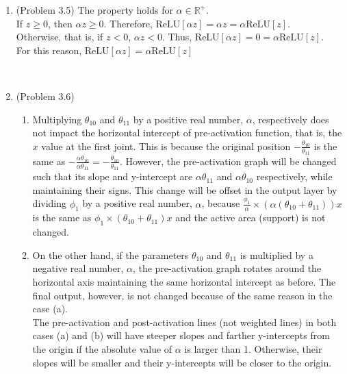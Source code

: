 \documentclass[10pt]{article}
\begin{document}
\begin{enumerate}
\

\item (Problem 3.5) The property holds for $\alpha \in \mathbb{R}^+$. \\
	If $z\geq0$, then $\alpha z\geq0$. Therefore, $\text{ReLU}[\alpha z]=\alpha z=\alpha \text{ReLU}[z]$. \\
	Otherwise, that is, if $z<0$, $\alpha z<0$. Thus, $\text{ReLU}[\alpha z]=0=\alpha \text{ReLU}[z]$. \\
	For this reason, $\text{ReLU}[\alpha z]=\alpha \text{ReLU}[z]$

\

\item (Problem 3.6)
	\begin{enumerate}[label=(\alph*)]
	\item Multiplying $\theta_{10}$ and $\theta_{11}$ by a positive real number, $\alpha$, respectively does not impact the horizontal intercept of pre-activation function, that is, the $x$ value at the first joint. This is because the original position $-\frac{\theta_{10}}{\theta_{11}}$ is the same as $-\frac{\alpha\theta_{10}}{\alpha\theta_{11}}=-\frac{\theta_{10}}{\theta_{11}}$. However, the pre-activation graph will be changed such that its slope and y-intercept are $\alpha\theta_{11}$ and $\alpha\theta_{10}$ respectively, while maintaining their signs. This change will be offset in the output layer by dividing $\phi_1$ by a positive real number, $\alpha$, because $\frac{\phi_1}{\alpha} \times (\alpha(\theta_{10}+\theta_{11}))x$ is the same as $\phi_1 \times (\theta_{10}+\theta_{11})x$ and the active area (support) is not changed.
	
	\item On the other hand, if the parameters $\theta_{10}$ and $\theta_{11}$ is multiplied by a negative real number, $\alpha$, the pre-activation graph rotates around the horizontal axis maintaining the same horizontal intercept as before. The final output, however, is not changed because of the same reason in the case (a). \\
	The pre-activation and post-activation lines (not weighted lines) in both cases (a) and (b) will have steeper slopes and farther y-intercepts from the origin if the absolute value of $\alpha$ is larger than 1. Otherwise, their slopes will be smaller and their y-intercepts will be closer to the origin.
	
	\end{enumerate}

\


\end{enumerate}
\end{document}
